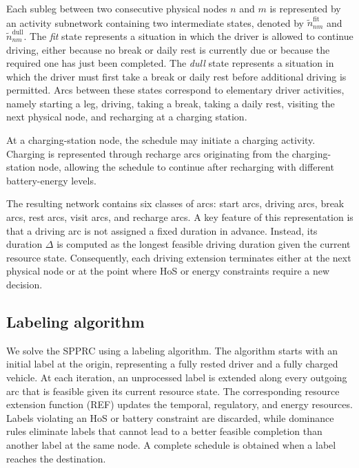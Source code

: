 \documentclass[3p,11pt,authoryear]{elsarticle}  %
\begin{document}
Each subleg between two consecutive physical nodes \(n\) and \(m\) is represented by an activity subnetwork containing two intermediate states, denoted by \(\tilde{n}_{nm}^{\mathrm{fit}}\) and \(\tilde{n}_{nm}^{\mathrm{dull}}\). The \emph{fit} state represents a situation in which the driver is allowed to continue driving, either because no break or daily rest is currently due or because the required one has just been completed. The \emph{dull} state represents a situation in which the driver must first take a break or daily rest before additional driving is permitted. Arcs between these states correspond to elementary driver activities, namely starting a leg, driving, taking a break, taking a daily rest, visiting the next physical node, and recharging at a charging station.

At a charging-station node, the schedule may initiate a charging activity. 
Charging is represented through recharge arcs originating from the charging-station node, allowing the schedule to continue after recharging with different battery-energy levels. 

The resulting network contains six classes of arcs: start arcs, driving arcs, break arcs, rest arcs, visit arcs, and recharge arcs. A key feature of this representation is that a driving arc is not assigned a fixed duration in advance. Instead, its duration \(\Delta\) is computed as the longest feasible driving duration given the current resource state.
Consequently, each driving extension terminates either at the next physical node or at the point where HoS or energy constraints require a new decision.



\subsection{Labeling algorithm}

We solve the SPPRC using a labeling algorithm. The algorithm starts with an initial label at the origin, representing a fully rested driver and a fully charged vehicle. At each iteration, an unprocessed label is extended along every outgoing arc that is feasible given its current resource state. The corresponding resource extension function (REF) updates the temporal, regulatory, and energy resources. Labels violating an HoS or battery constraint are discarded, while dominance rules eliminate labels that cannot lead to a better feasible completion than another label at the same node. A complete schedule is obtained when a label reaches the destination. 
\end{document}
